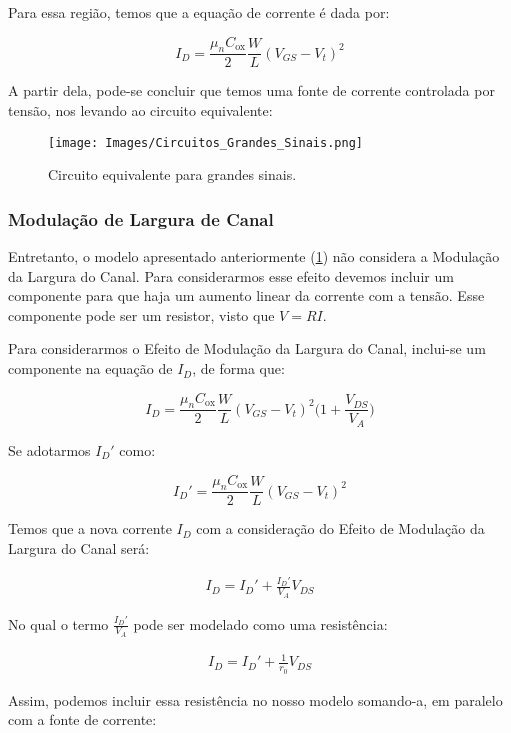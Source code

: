 \documentclass[12pt]{article}
\begin{document}
Para essa região, temos que a equação de corrente é dada por:

$$
  I_D = \frac{\mu_n C_{\text{ox}}}{2} \frac{W}{L} (V_{GS} - V_t)^2
$$

A partir dela, pode-se concluir que temos uma fonte de corrente controlada por tensão, nos levando ao circuito equivalente:

\begin{figure}[H]
  \begin{center}
    \texttt{[image: Images/Circuitos\_Grandes\_Sinais.png]}
  \end{center}
  \caption{Circuito equivalente para grandes sinais.}
  \label{fig:circuito_grandes_sinais}
\end{figure}

\subsubsection{Modulação de Largura de Canal}

Entretanto, o modelo apresentado anteriormente (\ref{fig:circuito_grandes_sinais}) não considera a Modulação da Largura do Canal. Para considerarmos esse efeito devemos incluir um componente para que haja um aumento linear da corrente com a tensão. Esse componente pode ser um resistor, visto que $V = RI$.

Para considerarmos o Efeito de Modulação da Largura do Canal, inclui-se um componente na equação de $I_D$, de forma que:

$$
  I_D = \frac{\mu_n C_{\text{ox}}}{2} \frac{W}{L} (V_{GS} - V_t)^2 \Biggl ( 1 + \frac{V_{DS}}{V_A} \Biggl )
$$

Se adotarmos $I_D'$ como:

$$
  I_D' = \frac{\mu_n C_{\text{ox}}}{2} \frac{W}{L} (V_{GS} - V_t)^2
$$

Temos que a nova corrente $I_D$ com a consideração do Efeito de Modulação da Largura do Canal será:

\begin{align}
  I_D = I_D' + \frac{I_D'}{V_A} V_{DS}
  \label{eq:id1}
\end{align}

No qual o termo $\frac{I_D'}{V_A}$ pode ser modelado como uma resistência: 

\begin{align}
  I_D = I_D' + \frac{1}{r_0} V_{DS}
  \label{eq:id2}
\end{align}

Assim, podemos incluir essa resistência no nosso modelo somando-a, em paralelo com a fonte de corrente:
\end{document}
